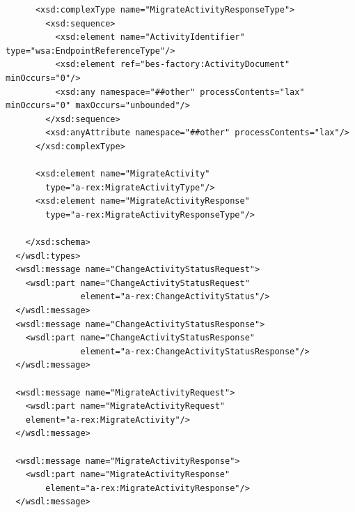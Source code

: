 \documentclass{article}                            %
\begin{document}
\begin{footnotesize}
\begin{verbatim}
      <xsd:complexType name="MigrateActivityResponseType">
        <xsd:sequence>
          <xsd:element name="ActivityIdentifier" type="wsa:EndpointReferenceType"/>
          <xsd:element ref="bes-factory:ActivityDocument" minOccurs="0"/>
          <xsd:any namespace="##other" processContents="lax" minOccurs="0" maxOccurs="unbounded"/>        
        </xsd:sequence>
        <xsd:anyAttribute namespace="##other" processContents="lax"/>
      </xsd:complexType>

      <xsd:element name="MigrateActivity"
        type="a-rex:MigrateActivityType"/>
      <xsd:element name="MigrateActivityResponse"
        type="a-rex:MigrateActivityResponseType"/>

    </xsd:schema>
  </wsdl:types>
  <wsdl:message name="ChangeActivityStatusRequest">
    <wsdl:part name="ChangeActivityStatusRequest"
               element="a-rex:ChangeActivityStatus"/>
  </wsdl:message>
  <wsdl:message name="ChangeActivityStatusResponse">
    <wsdl:part name="ChangeActivityStatusResponse"
               element="a-rex:ChangeActivityStatusResponse"/>
  </wsdl:message>
  
  <wsdl:message name="MigrateActivityRequest">
    <wsdl:part name="MigrateActivityRequest" 
	element="a-rex:MigrateActivity"/>
  </wsdl:message>

  <wsdl:message name="MigrateActivityResponse">
    <wsdl:part name="MigrateActivityResponse" 
        element="a-rex:MigrateActivityResponse"/>
  </wsdl:message>


\end{verbatim}
\end{footnotesize}
\end{document}
